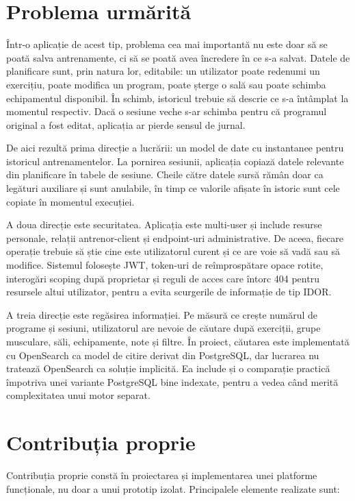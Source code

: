\section{Problema urmărită}

Într-o aplicație de acest tip, problema cea mai importantă nu este doar să se poată salva antrenamente,
ci să se poată avea încredere în ce s-a salvat. Datele de planificare sunt, prin natura lor,
editabile: un utilizator poate redenumi un exercițiu, poate modifica un program, poate șterge o sală
sau poate schimba echipamentul disponibil. În schimb, istoricul trebuie să descrie ce s-a întâmplat
la momentul respectiv. Dacă o sesiune veche s-ar schimba pentru că programul original a fost editat,
aplicația ar pierde sensul de jurnal.

De aici rezultă prima direcție a lucrării: un model de date cu instantanee pentru istoricul
antrenamentelor. La pornirea sesiunii, aplicația copiază datele relevante din planificare în tabele de
sesiune. Cheile către datele sursă rămân doar ca legături auxiliare și sunt anulabile, în timp ce
valorile afișate în istoric sunt cele copiate în momentul execuției.

A doua direcție este securitatea. Aplicația este multi-user și include resurse personale, relații
antrenor-client și endpoint-uri administrative. De aceea, fiecare operație trebuie să știe cine este
utilizatorul curent și ce are voie să vadă sau să modifice. Sistemul folosește JWT, token-uri de
reîmprospătare opace rotite, interogări scoping după proprietar și reguli de acces care întorc 404
pentru resursele altui utilizator, pentru a evita scurgerile de informație de tip IDOR.

A treia direcție este regăsirea informației. Pe măsură ce crește numărul de programe și sesiuni,
utilizatorul are nevoie de căutare după exerciții, grupe musculare, săli, echipamente, note și
filtre. În proiect, căutarea este implementată cu OpenSearch ca model de citire derivat din
PostgreSQL, dar lucrarea nu tratează OpenSearch ca soluție implicită. Ea include și o comparație
practică împotriva unei variante PostgreSQL bine indexate, pentru a vedea când merită complexitatea
unui motor separat.

\section{Contribuția proprie}

Contribuția proprie constă în proiectarea și implementarea unei platforme funcționale, nu doar a unui
prototip izolat. Principalele elemente realizate sunt:

